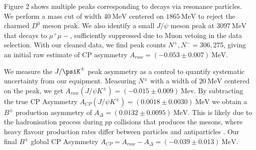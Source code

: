 \documentclass[11pt, twocolumn]{article}
\begin{document}
Figure 2 shows multiple peaks corresponding to decays via resonance particles. We perform a mass cut of width $40 \ \mathrm{MeV}$ centered on $1865 \ \mathrm{MeV}$ to reject the charmed $D^0$ meson peak. We also identify a small $J/\psi$ meson peak at $3097 \ \mathrm{MeV}$ that decays to $\mu^{+}\mu{-}$, sufficiently suppressed due to Muon vetoing in the data selection. With our cleaned data, we find peak counts $N^{+}, N^{-} = 306, 275$, giving an initial raw estimate of CP asymmetry $A_{raw} = (-0.053 \pm 0.007) \ \mathrm{MeV}$.\newline  

We measure the $J/\psiK^{\pm}$ peak asymmetry as a control to quantify systematic uncertainty from our equipment. Measuring $N^\pm$ with a width of $20 \ \mathrm{MeV}$ centered on the peak, we get $A_{raw}(J/\psi K^{\pm}) = (−0.015 \pm 0.009) \ \mathrm{Mev}$. By subtracting the true CP Asymmetry $A_{CP}(J/\psi K^{\pm}) = (0.0018 \pm 0.0030) \ \mathrm{MeV}$ \cite{Bplusminus} we obtain a $B^{\pm}$ production asymmetry of $A_\Delta = (0.0132 \pm 0.0095) \ \mathrm{MeV}$. This is likely due to the hadronisation process during $pp$ collisions that produces the mesons, where heavy flavour production rates differ between particles and antiparticles \cite{production}. Our final $B^{\pm}$ global CP Asymmetry $A_{CP} = A_{raw} - A_{\Delta} = (-0.039 \pm 0.013) \ \mathrm{MeV}$. \newline     
\end{document}
